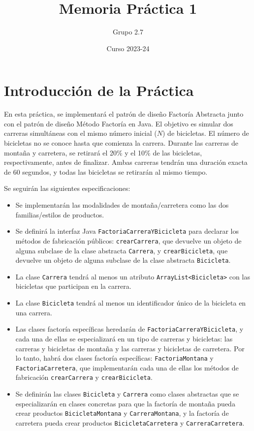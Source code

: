 \documentclass{article}
\title{Memoria Práctica 1}
\author{Grupo 2.7}
\date{Curso 2023-24}
\begin{document}
\maketitle

\section{Introducción de la Práctica}
En esta práctica, se implementará el patrón de diseño Factoría Abstracta junto con el patrón de diseño Método Factoría en Java. El objetivo es simular dos carreras simultáneas con el mismo número inicial ($N$) de bicicletas. El número de bicicletas no se conoce hasta que comienza la carrera. Durante las carreras de montaña y carretera, se retirará el 20\% y el 10\% de las bicicletas, respectivamente, antes de finalizar. Ambas carreras tendrán una duración exacta de 60 segundos, y todas las bicicletas se retirarán al mismo tiempo.

Se seguirán las siguientes especificaciones: 

\begin{itemize}
    \item Se implementarán las modalidades de montaña/carretera como las dos familias/estilos de productos.
    \item Se definirá la interfaz Java \texttt{FactoriaCarreraYBicicleta} para declarar los métodos de fabricación públicos: \texttt{crearCarrera}, que devuelve un objeto de alguna subclase de la clase abstracta \texttt{Carrera}, y \texttt{crearBicicleta}, que devuelve un objeto de alguna subclase de la clase abstracta \texttt{Bicicleta}.
    \item La clase \texttt{Carrera} tendrá al menos un atributo \texttt{ArrayList<Bicicleta>} con las bicicletas que participan en la carrera.
    \item La clase \texttt{Bicicleta} tendrá al menos un identificador único de la bicicleta en una carrera.
    \item Las clases factoría específicas heredarán de \texttt{FactoriaCarreraYBicicleta}, y cada una de ellas se especializará en un tipo de carreras y bicicletas: las carreras y bicicletas de montaña y las carreras y bicicletas de carretera. Por lo tanto, habrá dos clases factoría específicas: \texttt{FactoriaMontana} y \texttt{FactoriaCarretera}, que implementarán cada una de ellas los métodos de fabricación \texttt{crearCarrera} y \texttt{crearBicicleta}.
    \item Se definirán las clases \texttt{Bicicleta} y \texttt{Carrera} como clases abstractas que se especializarán en clases concretas para que la factoría de montaña pueda crear productos \texttt{BicicletaMontana} y \texttt{CarreraMontana}, y la factoría de carretera pueda crear productos \texttt{BicicletaCarretera} y \texttt{CarreraCarretera}.
\end{itemize}
\end{document}
